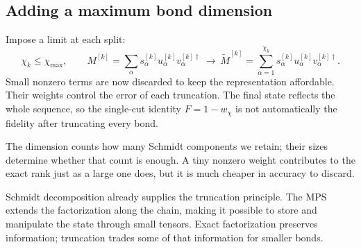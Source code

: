 \documentclass[11pt]{article}
\begin{document}
\subsection*{Adding a maximum bond dimension}
Impose a limit at each split:
\begin{equation}
\chi_k\leq\chi_{\max},\qquad
M^{[k]}=\sum_\alpha s^{[k]}_\alpha u^{[k]}_\alpha v^{[k]\dagger}_\alpha
\ \longrightarrow\ 
\widetilde M^{[k]}=\sum_{\alpha=1}^{\chi_k}
s^{[k]}_\alpha u^{[k]}_\alpha v^{[k]\dagger}_\alpha.
\end{equation}
Small nonzero terms are now discarded to keep the representation affordable. Their weights control the error of each truncation. The final state reflects the whole sequence, so the single-cut identity $F=1-w_\chi$ is not automatically the fidelity after truncating every bond.

The dimension counts how many Schmidt components we retain; their sizes determine whether that count is enough. A tiny nonzero weight contributes to the exact rank just as a large one does, but it is much cheaper in accuracy to discard.

Schmidt decomposition already supplies the truncation principle. The MPS extends the factorization along the chain, making it possible to store and manipulate the state through small tensors. Exact factorization preserves information; truncation trades some of that information for smaller bonds.
\end{document}
